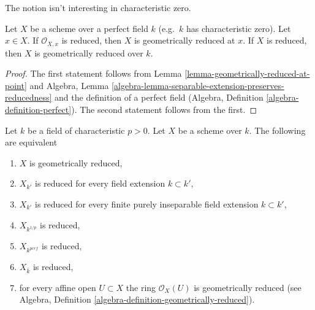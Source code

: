 \noindent
The notion isn't interesting in characteristic zero.

\begin{lemma}
\label{lemma-perfect-reduced}
Let $X$ be a scheme over a perfect field $k$ (e.g.\ $k$ has
characteristic zero). Let $x \in X$. If $\mathcal{O}_{X, x}$ is
reduced, then $X$ is geometrically reduced at $x$.
If $X$ is reduced, then $X$ is geometrically reduced over $k$.
\end{lemma}

\begin{proof}
The first statement follows from
Lemma \ref{lemma-geometrically-reduced-at-point} and
Algebra, Lemma \ref{algebra-lemma-separable-extension-preserves-reducedness}
and the definition of a perfect field
(Algebra, Definition \ref{algebra-definition-perfect}).
The second statement follows from the first.
\end{proof}

\begin{lemma}
\label{lemma-geometrically-reduced}
Let $k$ be a field of characteristic $p > 0$. Let $X$ be a scheme over $k$.
The following are equivalent
\begin{enumerate}
\item $X$ is geometrically reduced,
\item $X_{k'}$ is reduced for every field extension $k \subset k'$,
\item $X_{k'}$ is reduced for every finite purely inseparable field extension
$k \subset k'$,
\item $X_{k^{1/p}}$ is reduced,
\item $X_{k^{perf}}$ is reduced,
\item $X_{\bar k}$ is reduced,
\item for every affine open $U \subset X$ the ring $\mathcal{O}_X(U)$
is geometrically reduced (see
Algebra, Definition \ref{algebra-definition-geometrically-reduced}).
\end{enumerate}
\end{lemma}

